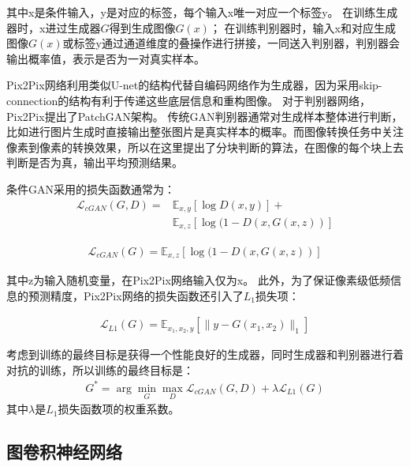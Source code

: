 其中x是条件输入，y是对应的标签，每个输入x唯一对应一个标签y。
在训练生成器时，x进过生成器$G$得到生成图像$G(x)$；
在训练判别器时，输入x和对应生成图像$G(x)$或标签y通过通道维度的叠操作进行拼接，一同送入判别器，判别器会输出概率值，表示是否为一对真实样本。



Pix2Pix网络利用类似U-net的结构代替自编码网络作为生成器，因为采用skip-connection的结构有利于传递这些底层信息和重构图像。
对于判别器网络，Pix2Pix提出了PatchGAN架构。
传统GAN判别器通常对生成样本整体进行判断，比如进行图片生成时直接输出整张图片是真实样本的概率。而图像转换任务中关注像素到像素的转换效果，所以在这里提出了分块判断的算法，在图像的每个块上去判断是否为真，输出平均预测结果。


条件GAN采用的损失函数通常为：
\begin{equation}
\begin{aligned}
\mathcal{L}_{c G A N}(G, D)= &\mathbb{E}_{x,y}[\log D(x,y)]+\\
&\mathbb{E}_{x,z }[\log (1-D(x, G(x,z))]
\end{aligned}
\end{equation}

\begin{equation}
\begin{aligned}
\mathcal{L}_{c G A N}(G)= \mathbb{E}_{x,z}[\log (1-D(x, G(x, z))]
\end{aligned}
\end{equation}

\noindent 其中z为输入随机变量，在Pix2Pix网络输入仅为x。
此外，为了保证像素级低频信息的预测精度，Pix2Pix网络的损失函数还引入了$L_1$损失项：

\begin{equation}
\begin{aligned}
\mathcal{L}_{L 1}(G)=\mathbb{E}_{x_1, x_2, y}\left[\|y-G(x_1, x_2)\|_{1}\right]
\end{aligned}
\end{equation}

考虑到训练的最终目标是获得一个性能良好的生成器，同时生成器和判别器进行着对抗的训练，所以训练的最终目标是：
\begin{equation}
\begin{aligned}
G^{*}=\arg \min _{G} \max _{D} \mathcal{L}_{c G A N}(G, D)+\lambda \mathcal{L}_{L 1}(G)
\end{aligned}
\end{equation}
\noindent 其中$\lambda$是$L_1$损失函数项的权重系数。


\subsection{图卷积神经网络}

